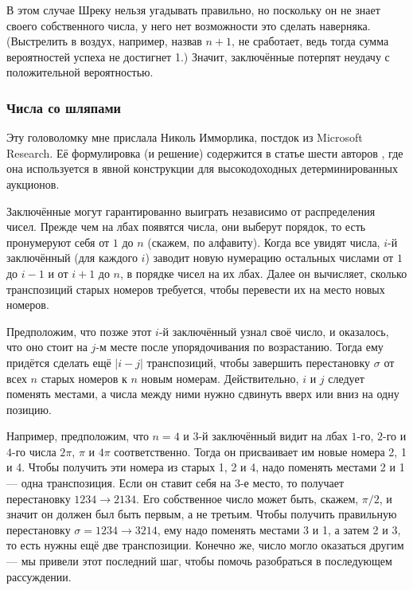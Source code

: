 В этом случае Шреку нельзя угадывать правильно, но поскольку он не знает своего собственного числа, у него нет возможности это сделать наверняка.
(Выстрелить в воздух, например, назвав $n + 1$, не сработает, ведь тогда сумма вероятностей успеха не достигнет 1.)
Значит, заключённые потерпят неудачу с положительной вероятностью.

\subsubsection*{Числа со шляпами}

Эту головоломку мне прислала Николь Имморлика, постдок из Microsoft Research.
Её формулировка (и решение) содержится в статье шести авторов \cite{1}, где она используется в явной конструкции для высокодоходных детерминированных аукционов.

Заключённые могут гарантированно выиграть независимо от распределения чисел.
Прежде чем на лбах появятся числа, они выберут порядок, то есть пронумеруют себя от $1$ до $n$ (скажем, по алфавиту).
Когда все увидят числа, $i$-й заключённый (для каждого $i$) заводит новую нумерацию остальных числами от $1$ до $i - 1$ и от $i + 1$ до $n$, в порядке чисел на их лбах.
Далее он вычисляет, сколько транспозиций старых номеров требуется, чтобы перевести их на место новых номеров.

Предположим, что позже этот $i$-й заключённый узнал своё число, и оказалось, что оно стоит на $j$-м месте после упорядочивания по возрастанию.
Тогда ему придётся сделать ещё $|i - j|$ транспозиций, чтобы завершить перестановку $\sigma$ от всех $n$ старых номеров к $n$ новым номерам.
Действительно, $i$ и $j$ следует поменять местами, а числа между ними нужно сдвинуть вверх или вниз на одну позицию.

Например, предположим, что $n = 4$ и $3$-й заключённый видит на лбах $1$-го, $2$-го и $4$-го числа $2\pi$, $\pi$ и $4\pi$ соответственно.
Тогда он присваивает им новые номера 2, 1 и 4.
Чтобы получить эти номера из старых 1, 2 и 4, надо поменять местами 2 и 1 --- одна транспозиция.
Если он ставит себя на 3-е место, то получает перестановку $1234 \to  2134$.
Его собственное число может быть, скажем, $\pi/2$, и значит он должен был быть первым, а не третьим.
Чтобы получить правильную перестановку  $\sigma  = 1234 \to  3214$, ему надо поменять местами 3 и 1, а затем 2 и 3, то есть нужны ещё две транспозиции.
Конечно же, число могло оказаться другим --- мы привели этот последний шаг, чтобы помочь разобраться в последующем  рассуждении.

